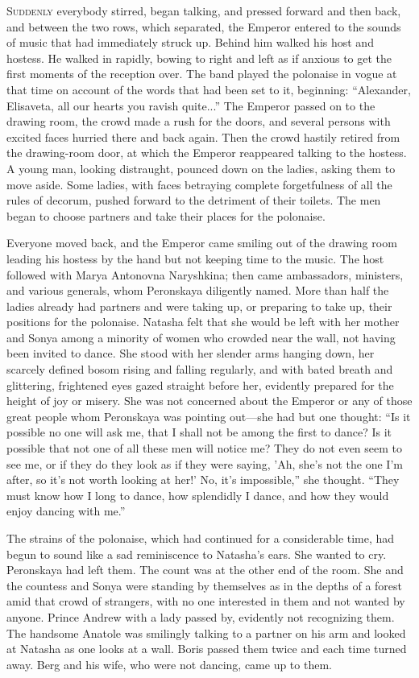 \lettrine[lines=2, loversize=0.3, lraise=0]{\initfamily S}{uddenly}
everybody stirred, began talking, and pressed forward
and then back, and between the two rows, which separated, the
Emperor entered to the sounds of music that had immediately
struck up. Behind him walked his host and hostess. He walked in
rapidly, bowing to right and left as if anxious to get the first
moments of the reception over. The band played the polonaise in
vogue at that time on account of the words that had been set to
it, beginning: ``Alexander, Elisaveta, all our hearts you ravish
quite...'' The Emperor passed on to the drawing room, the crowd
made a rush for the doors, and several persons with excited faces
hurried there and back again. Then the crowd hastily retired from
the drawing-room door, at which the Emperor reappeared talking to
the hostess. A young man, looking distraught, pounced down on the
ladies, asking them to move aside. Some ladies, with faces
betraying complete forgetfulness of all the rules of decorum,
pushed forward to the detriment of their toilets. The men began
to choose partners and take their places for the polonaise.

Everyone moved back, and the Emperor came smiling out of the
drawing room leading his hostess by the hand but not keeping time
to the music.  The host followed with Marya Antonovna Naryshkina;
then came ambassadors, ministers, and various generals, whom
Peronskaya diligently named. More than half the ladies already
had partners and were taking up, or preparing to take up, their
positions for the polonaise. Natasha felt that she would be left
with her mother and Sonya among a minority of women who crowded
near the wall, not having been invited to dance.  She stood with
her slender arms hanging down, her scarcely defined bosom rising
and falling regularly, and with bated breath and glittering,
frightened eyes gazed straight before her, evidently prepared for
the height of joy or misery. She was not concerned about the
Emperor or any of those great people whom Peronskaya was pointing
out---she had but one thought: ``Is it possible no one will ask
me, that I shall not be among the first to dance? Is it possible
that not one of all these men will notice me? They do not even
seem to see me, or if they do they look as if they were saying,
'Ah, she's not the one I'm after, so it's not worth looking at
her!' No, it's impossible,'' she thought. ``They must know how I
long to dance, how splendidly I dance, and how they would enjoy
dancing with me.''

The strains of the polonaise, which had continued for a
considerable time, had begun to sound like a sad reminiscence to
Natasha's ears. She wanted to cry. Peronskaya had left them. The
count was at the other end of the room. She and the countess and
Sonya were standing by themselves as in the depths of a forest
amid that crowd of strangers, with no one interested in them and
not wanted by anyone. Prince Andrew with a lady passed by,
evidently not recognizing them. The handsome Anatole was
smilingly talking to a partner on his arm and looked at Natasha
as one looks at a wall. Boris passed them twice and each time
turned away. Berg and his wife, who were not dancing, came up to
them.


